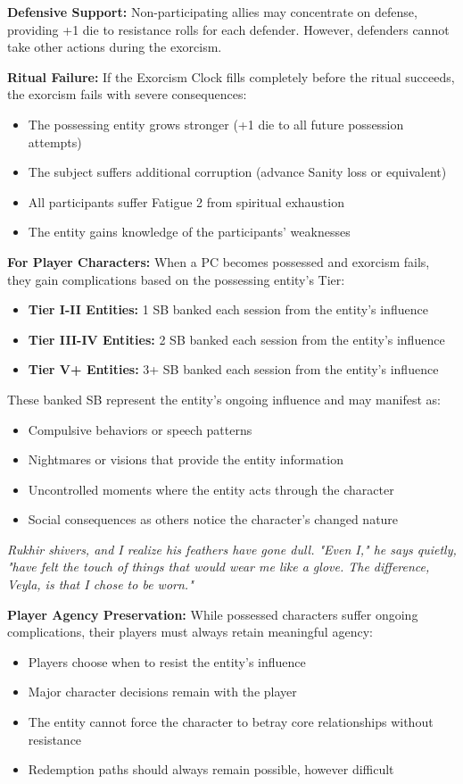 \documentclass[12pt,twoside]{book}
\newcommand{\shadow}[1]{\textit{#1}}
\begin{document}
\textbf{Defensive Support:}
Non-participating allies may concentrate on defense, providing +1 die to resistance rolls for each defender. However, defenders cannot take other actions during the exorcism.

\textbf{Ritual Failure:}
If the Exorcism Clock fills completely before the ritual succeeds, the exorcism fails with severe consequences:
\begin{itemize}
\item The possessing entity grows stronger (+1 die to all future possession attempts)
\item The subject suffers additional corruption (advance Sanity loss or equivalent)
\item All participants suffer Fatigue 2 from spiritual exhaustion
\item The entity gains knowledge of the participants' weaknesses
\end{itemize}

\textbf{For Player Characters:}
When a PC becomes possessed and exorcism fails, they gain complications based on the possessing entity's Tier:
\begin{itemize}
\item \textbf{Tier I-II Entities:} 1 SB banked each session from the entity's influence
\item \textbf{Tier III-IV Entities:} 2 SB banked each session from the entity's influence  
\item \textbf{Tier V+ Entities:} 3+ SB banked each session from the entity's influence
\end{itemize}

These banked SB represent the entity's ongoing influence and may manifest as:
\begin{itemize}
\item Compulsive behaviors or speech patterns
\item Nightmares or visions that provide the entity information
\item Uncontrolled moments where the entity acts through the character
\item Social consequences as others notice the character's changed nature
\end{itemize}

\shadow{Rukhir shivers, and I realize his feathers have gone dull. "Even I," he says quietly, "have felt the touch of things that would wear me like a glove. The difference, Veyla, is that I chose to be worn."}

\textbf{Player Agency Preservation:}
While possessed characters suffer ongoing complications, their players must always retain meaningful agency:
\begin{itemize}
\item Players choose when to resist the entity's influence
\item Major character decisions remain with the player
\item The entity cannot force the character to betray core relationships without resistance
\item Redemption paths should always remain possible, however difficult
\end{itemize}
\end{document}
